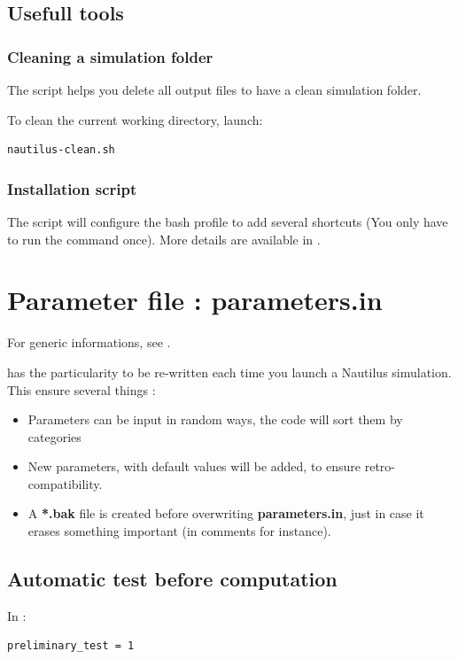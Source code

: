 \documentclass[english,a4paper,twoside]{article}
\begin{document}
\subsection{Usefull tools}
\subsubsection{Cleaning a simulation folder}
The script  helps you delete all output files to have a clean simulation folder.

To clean the current working directory, launch:
\begin{verbatim}
nautilus-clean.sh
\end{verbatim}

\subsubsection{Installation script}
The script  will configure the bash profile to add several shortcuts (You only have to run the command once). More details are available in .

\section{Parameter file : parameters.in}\label{sec:parameters_in}
For generic informations, see .

 has the particularity to be re-written each time you launch a Nautilus simulation. This ensure several things :
\begin{itemize}
\item Parameters can be input in random ways, the code will sort them by categories
\item New parameters, with default values will be added, to ensure retro-compatibility.
\item A \textbf{*.bak} file is created before overwriting \textbf{parameters.in}, just in case it erases something important (in comments for instance).
\end{itemize}

\subsection{Automatic test before computation}
In : 
\begin{verbatim}
preliminary_test = 1
\end{verbatim}
\end{document}
